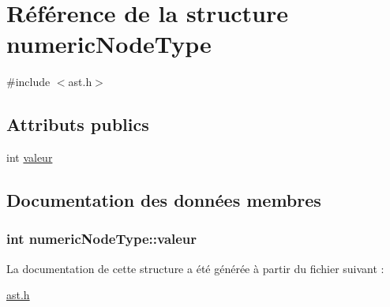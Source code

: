 \hypertarget{structnumericNodeType}{\section{Référence de la structure numeric\-Node\-Type}
\label{structnumericNodeType}
}


{\ttfamily \#include $<$ast.\-h$>$}

\subsection*{Attributs publics}
\begin{DoxyCompactItemize}
\item 
int \hyperlink{structnumericNodeType_a83d1186d182d49a378276ccaa72031c6}{valeur}
\end{DoxyCompactItemize}


\subsection{Documentation des données membres}
\hypertarget{structnumericNodeType_a83d1186d182d49a378276ccaa72031c6}{
\subsubsection[{valeur}]{\setlength{\rightskip}{0pt plus 5cm}int numeric\-Node\-Type\-::valeur}}\label{structnumericNodeType_a83d1186d182d49a378276ccaa72031c6}


La documentation de cette structure a été générée à partir du fichier suivant \-:\begin{DoxyCompactItemize}
\item 
\hyperlink{ast_8h}{ast.\-h}\end{DoxyCompactItemize}
